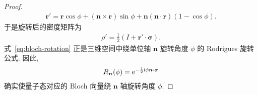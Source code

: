 \documentclass[a4paper]{ctexart}
\begin{document}
\begin{proof}
\begin{align}
        \bm r'=\bm r\cos\phi+(\bm n\times\bm r)\sin\phi+\bm n(\bm n\cdot\bm r)(1-\cos\phi).
    \end{align}
    于是旋转后的密度矩阵为
    \begin{align}
        \rho'=\frac{1}{2}\left(I+\bm r'\cdot\bm\sigma\right).
    \end{align}
    式~\eqref{eq:bloch-rotation} 正是三维空间中绕单位轴 $\bm n$ 旋转角度 $\phi$ 的 Rodrigues 旋转公式. 因此,
    \begin{align}
        R_{\bm n}(\phi)=\mathrm{e}^{-\frac{1}{2}\mathrm{i}\phi\bm n\cdot\bm\sigma}
    \end{align}
    确实使量子态对应的 Bloch 向量绕 $\bm n$ 轴旋转角度 $\phi$.
\end{proof}
\end{document}
